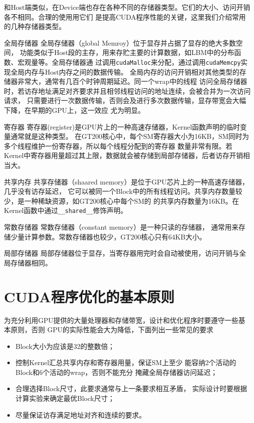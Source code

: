 和Host端类似，在Device端也存在各种不同的存储器类型。它们的大小、访问开销各不相同。合理的使用用它们
是提高CUDA程序性能的关键，这里我们介绍常用的几种存储器类型。
\begin{myDescription}
\item[全局存储器] 
全局存储器（global Memroy）位于显存并占据了显存的绝大多数空间，
功能类似于Host段的主存，用来存贮主要的计算数据，如LBM中的分布函数、宏观量等。全局存储器通
过调用\texttt{cudaMalloc}来分配，通过调用\texttt{cudaMemcpy}实现全局内存与Host内存之间的数据传输。
全局内存的访问开销相对其他类型的存储器非常大，通常有几百个时钟周期延迟。同一个wrap中的线程
访问全局存储器时，若访存地址满足对齐要求并且相邻线程访问的地址连续，会被合并为一次访问请求，
只需要进行一次数据传输，否则会及进行多次数据传输，显存带宽会大幅下降，在早期的GPU上，这一效应
尤为明显。

\item[寄存器] 寄存器(register)是GPU片上的一种高速存储器，Kernel函数声明的临时变量通常就是这种类型。
在GT200核心中，每个SM寄存器大小为16KB，SM同时为多个线程维护一份寄存器，所以每个线程分配到的寄存器
数量非常有限。若Kernel中寄存器用量超过其上限，数据就会被存储到局部存储器，后者访存开销相当大。

\item[共享内存] 共享存储器（shaared memory）是位于GPU芯片上的一种高速存储器，几乎没有访存延迟，
它可以被同一个Block中的所有线程访问。共享内存数量较少，是一种稀缺资源，如GT200核心中每个SM的
的共享内存数量为16KB。在Kernel函数中通过\texttt{\_\_shared\_\_}修饰声明。

\item[常数存储器] 常数存储器（constant memory）是一种只读的存储器，
  通常用来存储少量计算参数。常数存储器也较少，GT200核心只有64KB大小。

\item[局部存储器] 局部存储器位于显存，当寄存器用完时会自动被使用，访问开销与全局存储器相同。
\end{myDescription}

\section{CUDA程序优化的基本原则}\label{sec:cuda_principle}
为充分利用GPU提供的大量处理器和存储带宽，设计和优化程序时要遵守一些基本原则，否则
GPU的实际性能会大为降低，下面列出一些常见的要求
\begin{itemize}
  \item Block大小为应该是32的整数倍；
  \item 控制Kernel汇总共享内存和寄存器用量，保证SM上至少
    能容纳2个活动的Block和6个活动的wrap，否则不能充分
    掩藏全局存储器访问延迟；
  \item 合理选择Block尺寸，此要求通常与上一条要求相互矛盾，
    实际设计时要根据计算实验来确定最优Block尺寸；
  \item 尽量保证访存满足地址对齐和连续的要求。
\end{itemize}

